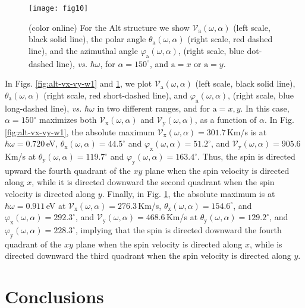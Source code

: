 \documentclass[floatfix,prb,aps,superscriptaddress,showpacs,11pt,preprint,letterpaper]{revtex4}
\def\tama{10cm}
\begin{document}
\begin{figure}[tb]
\centering
\texttt{[image: fig10]}
\caption{(color online) For the Alt structure we show
$\mathcal{V}_{\mathrm{a}} (\omega,\alpha)$ (left scale, black solid line), the polar
angle $\theta_{\mathrm{a}} (\omega,\alpha)$ (right scale, red dashed  line), and the
azimuthal angle $\varphi_{\mathrm{a}} (\omega,\alpha)$, (right scale, blue dot-dashed 
line), {\it vs.} $\hbar\omega$, for $\alpha=150^\circ$, and $\mathrm{a}=x$ or
$\mathrm{a}=y$. }
\label{fig:alt-vx-vy-w2}
\end{figure}

In Figs. \ref{fig:alt-vx-vy-w1} and \ref{fig:alt-vx-vy-w2}, we plot
$\mathcal{V}_{\mathrm{a}} (\omega,\alpha)$ (left scale, black solid line),
$\theta_{\mathrm{a}} (\omega,\alpha)$ (right scale, red short-dashed  line), and
$\varphi_{\mathrm{a}} (\omega,\alpha)$, (right scale, blue long-dashed  line), {\it vs.}
$\hbar\omega$ in two different ranges, and  for $\mathrm{a}=x,y$. In this case,
$\alpha=150^\circ$  maximizes both $\mathcal{V}_{\mathrm{x}} (\omega,\alpha)$
and $\mathcal{V}_{\mathrm{y}} (\omega,\alpha)$, as a function of $\alpha$. In
Fig. \ref{fig:alt-vx-vy-w1}, the absolute maximum $\mathcal{V}_{\mathrm{x}}
(\omega,\alpha) = 301.7$\,Km/s is at $\hbar\omega=0.720$\,eV,
$\theta_{\mathrm{x}} (\omega,\alpha) = 44.5^{\circ}$ and
$\varphi_{\mathrm{x}}(\omega,\alpha) = 51.2^{\circ}$, and
$\mathcal{V}_{\mathrm{y}} (\omega,\alpha) = 905.6$\,Km/s at
$\theta_{\mathrm{y}} (\omega,\alpha) = 119.7^{\circ}$ and
$\varphi_{\mathrm{y}}(\omega,\alpha) = 163.4^{\circ}$. Thus, the spin is
directed upward the fourth quadrant of the $xy$ plane when the spin
velocity is directed along $x$, while it is directed downward the second
quadrant when the spin velocity is directed along $y$. 
Finally, in
Fig. \ref{fig:alt-vx-vy-w2}, the absolute maximum is at $\hbar\omega=0.911$\,eV
at $\mathcal{V}_{\mathrm{x}} (\omega,\alpha) = 276.3$\,Km/s,
$\theta_{\mathrm{x}} (\omega,\alpha) = 154.6^{\circ}$, and
$\varphi_{\mathrm{x}}(\omega,\alpha) = 292.3^{\circ}$, and
$\mathcal{V}_{\mathrm{y}} (\omega,\alpha) = 468.6$\,Km/s at
$\theta_{\mathrm{y}} (\omega,\alpha) = 129.2^{\circ}$, and
$\varphi_{\mathrm{y}}(\omega,\alpha) = 228.3^{\circ}$, implying that the spin
is directed downward the fourth quadrant of the $xy$ plane when the
spin velocity is directed along $x$, while is directed downward the third
quadrant when the spin velocity is directed along $y$.

\section{Conclusions}
\label{sec:conclusions}
\end{document}
